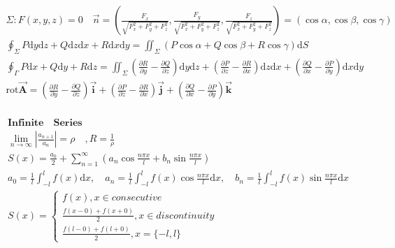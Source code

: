 \documentclass{article}
\begin{document}
\begin{align*}
    \Sigma:F(x,y,z)=0 \quad \vec{n}=\left(\frac{F_{x}}{\sqrt{F_{x}^2+F_{y}^2+F_{z}^2}},\frac{F_{y}}{\sqrt{F_{x}^2+F_{y}^2+F_{z}^2}},\frac{F_{z}}{\sqrt{F_{x}^2+F_{y}^2+F_{z}^2}}\right) = (\cos \alpha,\cos \beta,\cos \gamma)\\
    \oint_{\Sigma}P\mathrm{d}y\mathrm{d}z+Q\mathrm{d}z\mathrm{d}x+R\mathrm{d}x\mathrm{d}y = \iint_{\Sigma}(P\cos \alpha+Q\cos \beta+R\cos \gamma )\mathrm{d}S\\  
    \oint_{\Gamma}P\mathrm{d}x+Q\mathrm{d}y +R\mathrm{d}z = \iint_{\Sigma}(\frac{\partial R}{\partial y}-\frac{\partial Q}{\partial z})\mathrm{d}y\mathrm{d}z+(\frac{\partial P}{\partial z}-\frac{\partial R}{\partial x})\mathrm{d}z\mathrm{d}x+(\frac{\partial Q}{\partial x}-\frac{\partial P}{\partial y})\mathrm{d}x\mathrm{d}y \\
    \bm{\mathrm{rot}\vec{A}} = (\frac{\partial R}{\partial y}-\frac{\partial Q}{\partial z})\bm{\vec{i}}+(\frac{\partial P}{\partial z}-\frac{\partial R}{\partial x})\bm{\vec{j}}+(\frac{\partial Q}{\partial x}-\frac{\partial P}{\partial y})\bm{\vec{k}}\\
\end{align*}

\begin{align*}
    \bm{Infinite \quad Series} \\ 
    \lim_{n \to \infty} |\frac{a_{n+1}}{a_{n}}| = \rho \quad, R = \frac{1}{\rho} \\ 
    S(x) = \frac{a_{0}}{2} + \sum_{n=1}^{\infty}(a_{n}\cos{\frac{n\pi x}{l}} + b_{n}\sin{\frac{n\pi x}{l}}) \\ 
    a_{0} = \frac{1}{l}\int_{-l}^{l}f(x)\mathrm{d}x ,\quad a_{n} = \frac{1}{l}\int_{-l}^{l}f(x)\cos{\frac{n\pi x}{l}}\mathrm{d}x ,\quad b_{n} = \frac{1}{l}\int_{-l}^{l}f(x)\sin{\frac{n\pi x}{l}}\mathrm{d}x \\ 
    S(x) = \left\{ 
    \begin{array}{rl} 
        f(x),x \in consecutive \\ 
        \frac{f(x-0)+f(x+0)}{2},x \in discontinuity \\  
        \frac{f(l-0)+f(l+0)}{2},x = \{-l,l\} 
    \end{array} \right. \ \\ 
\end{align*}

\clearpage
\end{document}
